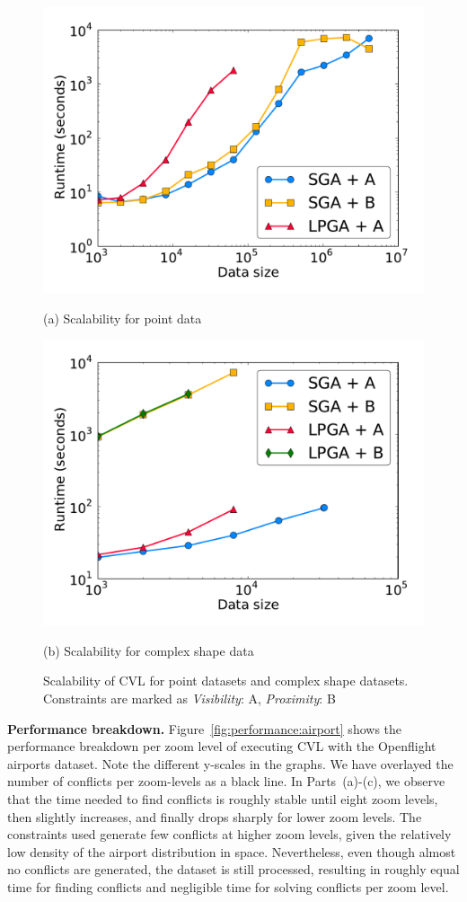 \documentclass[11pt, oneside]{report}
\newcommand{\minisec}[1]{\noindent\textbf{#1.}}
\begin{document}
\begin{figure}[tb]
  \begin{minipage}{0.49\linewidth}
    \centerline{\includegraphics[width=0.75\linewidth]{./figs-cvl/scal_pnt_30m_synthetic.pdf}}
    \centerline{(a) Scalability for point data}
  \end{minipage} \hfill
  \begin{minipage}{0.49\linewidth}
    \centerline{\includegraphics[width=0.75\linewidth]{./figs-cvl/scal_lin_30k_uswaterway.pdf}}
    \centerline{(b) Scalability for complex shape data}
  \end{minipage} \hfill
  \caption{Scalability of CVL for point datasets and complex shape datasets. Constraints are marked as \emph{Visibility}: A, \emph{Proximity}: B} \label{fig:cvl:scalability}
\end{figure}

\minisec{Performance breakdown}
Figure~\ref{fig:performance:airport} shows the performance breakdown per zoom level of executing CVL with the Openflight airports dataset. Note the different y-scales in the graphs. We have overlayed the number of conflicts per zoom-levels as a black line. In Parts~(a)-(c), we observe that the time needed to find conflicts is roughly stable until eight zoom levels, then slightly increases, and finally drops sharply for lower zoom levels. The constraints used generate few conflicts at higher zoom levels, given the relatively low density of the airport distribution in space. Nevertheless, even though almost no conflicts are generated, the dataset is still processed, resulting in roughly equal time for finding conflicts and negligible time for solving conflicts per zoom level. 
 
\end{document}
